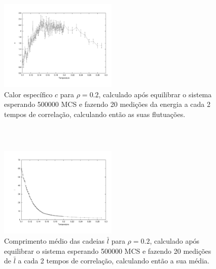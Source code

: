 \documentclass[11pt]{beamer}
\begin{document}
\begin{frame}
\frametitle{\insertsection \\ {\small \insertsubsection}}
\begin{figure}
	\centering
		\includegraphics[width=0.5\textwidth, clip, trim = 1.7cm 1.5cm 1cm 1cm]{images/0.2/c}
	\caption{{\footnotesize Calor específico $c$ para $\rho = 0.2$, calculado após equilibrar o sistema esperando 500000 MCS e fazendo 20 medições da energia a cada 2 tempos de correlação, calculando então as suas flutuações.}}
	\label{fig:15}
\end{figure}
\end{frame}

\begin{frame}
\frametitle{\insertsection \\ {\small \insertsubsection}}
\begin{figure}
	\centering
		\includegraphics[width=0.5\textwidth, clip, trim = 1.7cm 1.5cm 1cm 1cm]{images/0.2/l}
	\caption{{\footnotesize Comprimento médio das cadeias $\bar{l}$ para $\rho = 0.2$, calculado após equilibrar o sistema esperando 500000 MCS e fazendo 20 medições de $\bar{l}$ a cada 2 tempos de correlação, calculando então a sua média.}}
	\label{fig:16}
\end{figure}
\end{frame}
\end{document}
